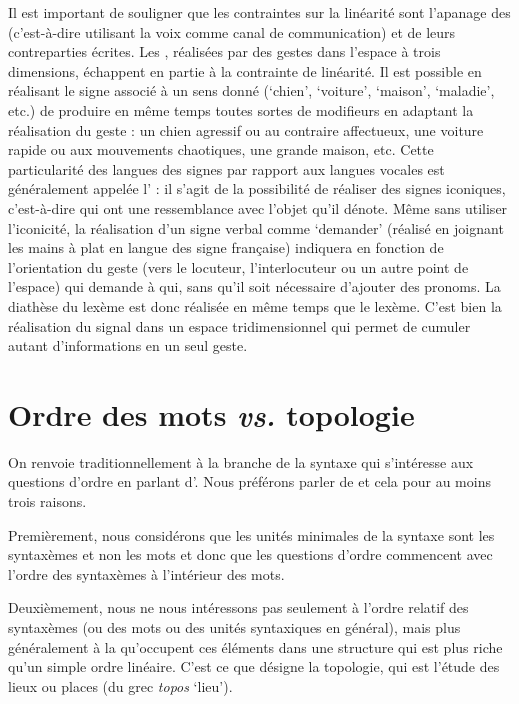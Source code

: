 {     Il est important de souligner que les contraintes sur la linéarité sont l’apanage des  (c’est-à-dire utilisant la voix comme canal de communication) et de leurs contreparties écrites. Les , réalisées par des gestes dans l’espace à trois dimensions, échappent en partie à la contrainte de linéarité. Il est possible en réalisant le signe associé à un sens donné (‘chien’, ‘voiture’, ‘maison’, ‘maladie’, etc.) de produire en même temps toutes sortes de modifieurs en adaptant la réalisation du geste : un chien agressif ou au contraire affectueux, une voiture rapide ou aux mouvements chaotiques, une grande maison, etc. Cette particularité des langues des signes par rapport aux langues vocales est généralement appelée l’ : il s’agit de la possibilité de réaliser des signes iconiques, c’est-à-dire qui ont une ressemblance avec l’objet qu’il dénote. Même sans utiliser l’iconicité, la réalisation d’un signe verbal comme ‘demander’ (réalisé en joignant les mains à plat en langue des signe française) indiquera en fonction de l’orientation du geste (vers le locuteur, l’interlocuteur ou un autre point de l’espace) qui demande à qui, sans qu’il soit nécessaire d’ajouter des pronoms. La diathèse du lexème est donc réalisée en même temps que le lexème. C’est bien la réalisation du signal dans un espace tridimensionnel qui permet de cumuler autant d’informations en un seul geste.
}
\section{Ordre des mots \textit{vs.} topologie}\label{sec:3.5.2}

On renvoie traditionnellement à la branche de la syntaxe qui s’intéresse aux questions d’ordre en parlant d’. Nous préférons parler de  et cela pour au moins trois raisons.

Premièrement, nous considérons que les unités minimales de la syntaxe sont les syntaxèmes et non les mots et donc que les questions d’ordre commencent avec l’ordre des syntaxèmes à l’intérieur des mots.

Deuxièmement, nous ne nous intéressons pas seulement à l’ordre relatif des syntaxèmes (ou des mots ou des unités syntaxiques en général), mais plus généralement à la  qu’occupent ces éléments dans une structure qui est plus riche qu’un simple ordre linéaire. C’est ce que désigne la topologie, qui est l’étude des lieux ou places (du grec \textit{topos} ‘lieu’).

